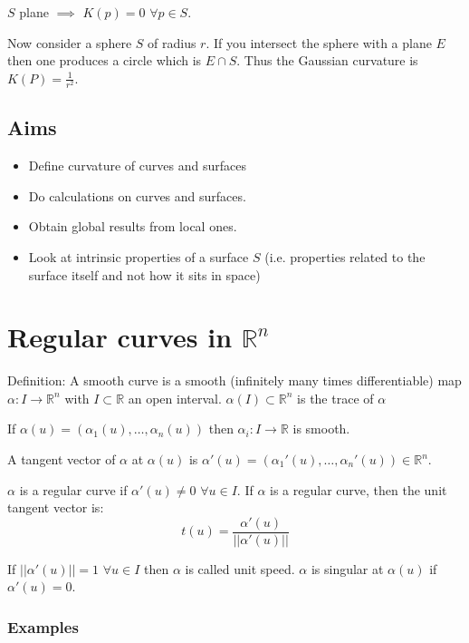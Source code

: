 $S$ plane $\implies$ $K(p) = 0$ $\forall p \in S$.

Now consider a sphere $S$ of radius $r$. If you intersect the sphere with a plane $E$ then one produces a circle which is $E \cap S$. Thus the Gaussian curvature is $K(P) = \frac{1}{r^2}$.

\subsection{Aims}

\begin{itemize}

\item Define curvature of curves and surfaces
\item Do calculations on curves and surfaces.
\item Obtain global results from local ones.
\item Look at intrinsic properties of a surface $S$ (i.e. properties related to the surface itself and not how it sits in space)

\end{itemize}

\section{Regular curves in $\mathbb{R}^n$}

Definition: A smooth curve is a smooth (infinitely many times differentiable) map $\alpha : I \rightarrow \mathbb{R}^n$ with $I \subset \mathbb{R}$ an open interval. $\alpha (I) \subset \mathbb{R}^n$ is the trace of $\alpha$

If $\alpha(u) = (\alpha_1 (u), \ldots, \alpha_n (u))$ then $\alpha_i : I \rightarrow \mathbb{R}$ is smooth.

\vspace{\baselineskip}

A tangent vector of $\alpha$ at $\alpha (u)$ is $\alpha ' (u) = (\alpha_1 ' (u), \ldots, \alpha_n ' (u)) \in \mathbb{R}^n$.

$\alpha$ is a regular curve if $\alpha ' (u) \neq 0$ $\forall u \in I$. If $\alpha$ is a regular curve, then the unit tangent vector is: $$t(u) = \frac{\alpha ' (u)}{||\alpha '(u)||}$$

If $||\alpha ' (u) || = 1$ $\forall u \in I$ then $\alpha$ is called unit speed. $\alpha$ is singular at $\alpha(u)$ if $\alpha ' (u) = 0$.

\subsubsection*{Examples}

